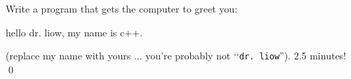 Write a program that gets the computer to greet you:
\begin{console}
hello dr. liow, my name is c++.
\end{console}
(replace my name with yours ...  you're probably not 
\lq\lq\verb!dr. liow!'').
2.5 minutes!
\qed
